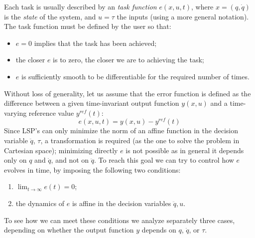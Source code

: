 	Each task is usually described by an \textit{task function} $e(x, u, t)$, where $x = (q,\dot q)$ is the \textit{state} of the system, and $u=\tau$ the inputs (using a more general notation).
	The task function must be defined by the user so that:
	\begin{itemize}
	\item $e=0$ implies that the task has been achieved;
	\item the closer $e$ is to zero, the closer we are to achieving the task;
	\item $e$ is sufficiently smooth to be differentiable for the required number of times.
	\end{itemize}
	Without loss of generality, let us assume that the error function is defined as the difference between a given time-invariant output function $y(x,u)$ and a time-varying reference value $y^{ref}(t)$:
	\begin{equation}
		e(x,u,t) = y(x,u) - y^{ref}(t)
	\end{equation}
	Since LSP's can only minimize the norm of an affine function in the decision variable $\ddot q$, $\tau$, a transformation is required (as the one to solve the problem in Cartesian space); minimizing directly $e$ is not possible as in general it depends only on $q$ and $\dot q$, and not on $\ddot q$.
	To reach this goal we can try to control how $e$ evolves in time, by imposing the following two conditions:
	\begin{enumerate}
		\item $\lim_{t\rightarrow \infty} e(t) = 0$;
		\item the dynamics of $e$ is affine in the decision variables $\ddot q, u$.
	\end{enumerate}
	To see how we can meet these conditions we analyze separately three cases, depending on whether the output function $y$ depends on $q$, $\dot q$, or $\tau$.
	
